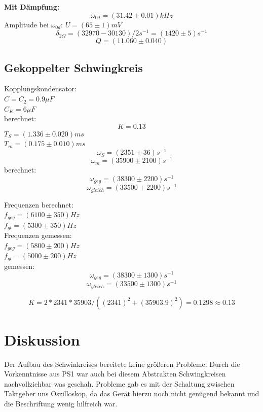\documentclass[12pt,a4paper]{article}
\begin{document}
\begin{multicols}{2}

\noindent \textbf{Mit Dämpfung:}\\
$$\omega_{0d} = (31.42 \pm 0.01) kHz$$
Amplitude bei $\omega_{0d}$: $U=(65 \pm 1)mV$\\
$$\delta_{2 \Omega} = (32970 - 30130)/2 s^{-1} = (1420 \pm 5) s^{-1}$$
$$Q = (11.060 \pm 0.040)$$

\subsection{Gekoppelter Schwingkreis}
Kopplungskondensator:\\
$C = C_2 = 0.9 \mu F$\\
$C_K = 6\mu F$\\
berechnet:\\
$$K = 0.13$$
$T_S = (1.336 \pm 0.020)ms$\\
$T_m = (0.175 \pm 0.010)ms$\\

$$\omega_S = (2351 \pm 36)s^{-1}$$
$$\omega_m = (35900 \pm 2100)s^{-1}$$
berechnet:\\
$$\omega_{geg} = (38300  \pm 2200)s^{-1}$$
$$\omega_{gleich} = (33500 \pm 2200)s^{-1}$$

\noindent Frequenzen berechnet:\\
$f_{geg}= (6100 \pm 350)Hz$\\
$f_{gl } = (5300 \pm 350)Hz$\\

\noindent Frequenzen gemessen:\\
$f_{geg} = (5800 \pm 200) Hz$\\
$f_{gl} = (5000 \pm 200) Hz$\\

\noindent gemessen:
$$\omega_{geg} = (38300  \pm 1300)s^{-1}$$
$$\omega_{gleich} = (33500 \pm 1300)s^{-1}$$


$$K = 2*2341*35903 /((2341)^2+(35903.9)^2) = 0.1298 \approx 0.13$$


\pagebreak
\section{Diskussion}

Der Aufbau des Schwinkreises bereitete keine größeren Probleme. Durch die Vorkenntnisse aus PS1 war auch bei diesem Abstrakten Schwingkreisen nachvollziehbar was geschah. Probleme gab es mit der Schaltung zwischen Taktgeber uns Oszilloskop, da das Gerät hierzu noch nicht genügend bekannt und die Beschriftung wenig hilfreich war.


\end{multicols}
\end{document}
